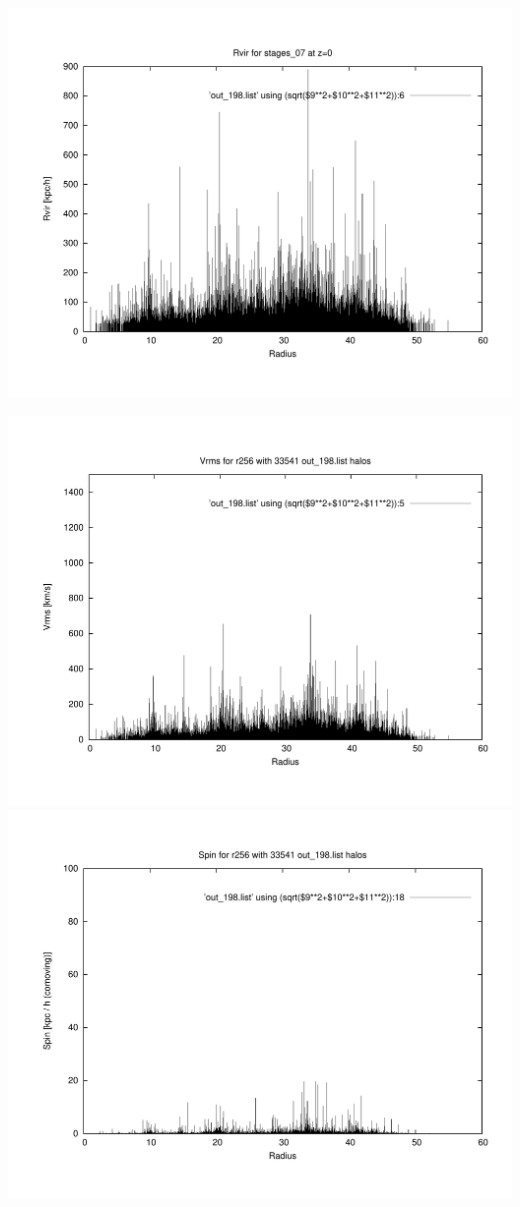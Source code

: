 \includegraphics[scale=0.3]{stages_07/plot_rvir_z0.pdf}

\includegraphics[scale=0.3]{stages_07/plot_Vrms_out_198.pdf}
\includegraphics[scale=0.3]{stages_07/plot_spin_out_198.pdf}


